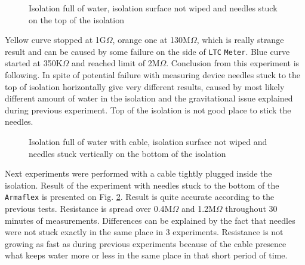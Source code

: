 \documentclass[a4paper, keeplastbox]{jacow}
\def\figurename{Fig.}
\begin{document}
\begin{figure}[H]
	\begin{center}
	\end{center}
	\caption{Isolation full of water, isolation surface not wiped and needles stuck on the top of the isolation}
	\label{fig:full_2}
\end{figure}

Yellow curve stopped at 1G$\Omega$, orange one at 130M$\Omega$, which is really strange result and can be caused by some failure on the side of \verb|LTC| \verb|Meter|. Blue curve started at 350K$\Omega$ and reached limit of 2M$\Omega$. Conclusion from this experiment is following. In spite of potential failure with measuring device needles stuck to the top of isolation horizontally give very different results, caused by most likely different amount of water in the isolation and the gravitational issue explained during previous experiment. Top of the isolation is not good place to stick the needles.

\begin{figure}[H]
	\begin{center}
		\scalebox{.7}{}
	\end{center}
	\caption{Isolation full of water with cable, isolation surface not wiped and needles stuck vertically on the bottom of the isolation}
	\label{fig:full_3}
\end{figure}

Next experiments were performed with a cable tightly plugged inside the isolation. Result of the experiment with needles stuck to the bottom of the \verb|Armaflex| is presented on \figurename{} \ref{fig:full_3}. Result is quite accurate according to the previous tests. Resistance is spread over \num{0.4}M$\Omega$ and \num{1.2}M$\Omega$ throughout 30 minutes of measurements. Differences can be explained by the fact that needles were not stuck exactly in the same place in 3 experiments. Resistance is not growing as fast as during previous experiments because of the cable presence what keeps water more or less in the same place in that short period of time.
\end{document}
